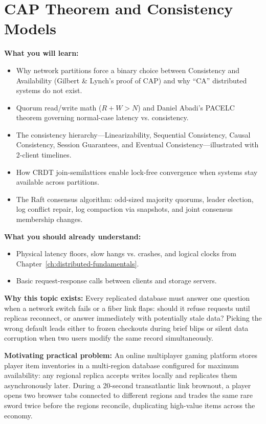 \chapter{CAP Theorem and Consistency Models}
\label{ch:cap-consistency}

\begin{chaptergoalsbox}
\textbf{What you will learn:}
\begin{itemize}[leftmargin=12pt]
  \item Why network partitions force a binary choice between Consistency and Availability (Gilbert \& Lynch's proof of CAP) and why ``CA'' distributed systems do not exist.
  \item Quorum read/write math ($R + W > N$) and Daniel Abadi's PACELC theorem governing normal-case latency vs. consistency.
  \item The consistency hierarchy---Linearizability, Sequential Consistency, Causal Consistency, Session Guarantees, and Eventual Consistency---illustrated with 2-client timelines.
  \item How CRDT join-semilattices enable lock-free convergence when systems stay available across partitions.
  \item The Raft consensus algorithm: odd-sized majority quorums, leader election, log conflict repair, log compaction via snapshots, and joint consensus membership changes.
\end{itemize}

\textbf{What you should already understand:}
\begin{itemize}[leftmargin=12pt]
  \item Physical latency floors, slow hangs vs. crashes, and logical clocks from Chapter~\ref{ch:distributed-fundamentals}.
  \item Basic request-response calls between clients and storage servers.
\end{itemize}

\textbf{Why this topic exists:}
Every replicated database must answer one question when a network switch fails or a fiber link flaps: should it refuse requests until replicas reconnect, or answer immediately with potentially stale data? Picking the wrong default leads either to frozen checkouts during brief blips or silent data corruption when two users modify the same record simultaneously.

\textbf{Motivating practical problem:}
An online multiplayer gaming platform stores player item inventories in a multi-region database configured for maximum availability: any regional replica accepts writes locally and replicates them asynchronously later. During a 20-second transatlantic link brownout, a player opens two browser tabs connected to different regions and trades the same rare sword twice before the regions reconcile, duplicating high-value items across the economy.
\end{chaptergoalsbox}

